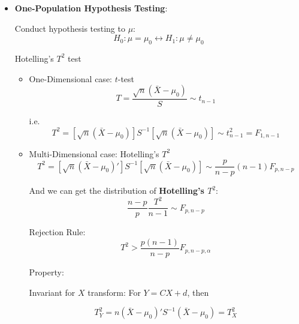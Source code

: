 \begin{itemize}[topsep=2pt,itemsep=2pt]
    \item \textbf{One-Population Hypothesis Testing}: 
    
    Conduct hypothesis testing to $ \mu $:
    \begin{equation}
        H_0: \mu=\mu_0\longleftrightarrow H_1:\mu\neq \mu_0
    \end{equation}

\begin{point}
    Hotelling's $ T^2 $ test
\end{point}

    
    \begin{itemize}[topsep=2pt,itemsep=2pt]
        \item One-Dimensional case: $ t $-test
        \begin{equation}
            T=\dfrac{\sqrt{n}(\bar{X}-\mu_0)}{S}\sim t_{n-1}
        \end{equation}
        
        i.e.
        \begin{equation}
            T^2=[\sqrt{n}(\bar{X}-\mu_0)]S^{-1}[\sqrt{n}(\bar{X}-\mu_0)] \sim t^2_{n-1}=F_{1,n-1}
        \end{equation}


        \item Multi-Dimensional case: Hotelling's $ T^2 $
        \begin{equation}
            T^2 =[\sqrt{n}(\bar{X}-\mu_0)']S^{-1}[\sqrt{n}(\bar{X}-\mu _0)] \sim \dfrac{p}{n-p}(n-1)F_{p,n-p}
        \end{equation}

        And we can get the distribution of \textbf{Hotelling's $ T^2 $}:
         \begin{equation} \dfrac{n-p}{p}\dfrac{T^2}{n-1}\sim F_{p,n-p} \end{equation}

        Rejection Rule:
        \begin{equation}
            T^2>\dfrac{p(n-1)}{n-p}F_{p,n-p,\alpha } 
        \end{equation}
        
        

        Property:

        Invariant for $ X $ transform: For $ Y=CX+d $, then 
            
            \begin{equation}
                T^2_Y=n(\bar{X}-\mu_0)'S^{-1}(\bar{X}-\mu_0)=T^2_X 
            \end{equation}
    \end{itemize}      
            

\end{itemize}
